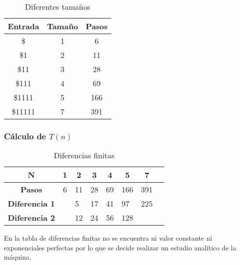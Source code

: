 \documentclass{uc3mpracticas}
\begin{document}
  \begin{table}[!h]
    \centering
  \begin{tabular}{|c|c|c|}
  \hline
  \textbf{Entrada} & \textbf{Tamaño} & \textbf{Pasos} \\ \hline
  \$     & 1               & 6             \\ \hline
  \$1    & 2               & 11             \\ \hline
  \$11   & 3               & 28             \\ \hline
  \$111  & 4               & 69             \\ \hline
  \$1111 & 5               & 166             \\ \hline
  \$11111         & 7               & 391             \\ \hline
  \end{tabular}
  \caption{Diferentes tamaños}
  \end{table}


  \subsubsection{Cálculo de $T(n)$}


  \begin{table}[!h]
    \centering
  \begin{tabular}{|c|p{1cm}|p{1cm}|p{1cm}|p{1cm}|p{1cm}|p{1cm}|p{1cm}|}
  \hline
  \textbf{N}     & \multicolumn{1}{c|}{\textbf{1}} & \multicolumn{1}{c|}{\textbf{2}} & \multicolumn{1}{c|}{\textbf{3}} & \multicolumn{1}{c|}{\textbf{4}} & \multicolumn{1}{c|}{\textbf{5}} & \multicolumn{1}{c|}{\textbf{7}}\\ \hline
  \textbf{Pasos} & \multicolumn{1}{c|}{6}          & \multicolumn{1}{c|}{11}          & \multicolumn{1}{c|}{28}         & \multicolumn{1}{c|}{69}         & \multicolumn{1}{c|}{166} & \multicolumn{1}{c|}{391} \\ \hline
  \textbf{Diferencia 1}& & 5 & 17 & 41 & 97 & 225\\ \hline
  \textbf{Diferencia 2}& & \multicolumn{1}{r|}{12}& \multicolumn{1}{r|}{24}& \multicolumn{1}{r|}{56} & \multicolumn{1}{r|}{128} & \\ \hline
  \end{tabular}
  \caption{Diferencias finitas}
  \end{table}

  En la tabla de diferencias finitas no se encuentra ni valor constante ni exponenciales perfectas por lo que se decide realizar un estudio analítico de la máquina.
\end{document}
